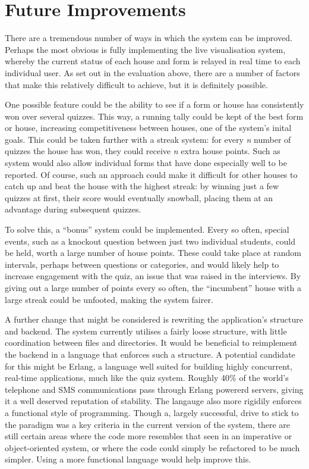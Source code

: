 \section{Future Improvements} %
\label{sec:future_improvements}
There are a tremendous number of ways in which the system can be improved. Perhaps the most obvious is fully implementing the live visualisation system, whereby the current status of each house and form is relayed in real time to each individual user. As set out in the evaluation above, there are a number of factors that make this relatively difficult to achieve, but it is definitely possible.

One possible feature could be the ability to see if a form or house has consistently won over several quizzes. This way, a running tally could be kept of the best form or house, increasing competitiveness between houses, one of the system's inital goals. This could be taken further with a streak system: for every \textit{n} number of quizzes the house has won, they could receive \textit{n} extra house points. Such as system would also allow individual forms that have done especially well to be reported. Of course, such an approach could make it difficult for other houses to catch up and beat the house with the highest streak: by winning just a few quizzes at first, their score would eventually snowball, placing them at an advantage during subsequent quizzes.

To solve this, a ``bonus'' system could be implemented. Every so often, special events, such as a knockout question between just two individual students, could be held, worth a large number of house points. These could take place at random intervals, perhaps between questions or categories, and would likely help to increase engagement with the quiz, an issue that was raised in the interviews. By giving out a large number of points every so often, the ``incumbent'' house with a large streak could be unfooted, making the system fairer.

A further change that might be considered is rewriting the application's structure and backend. The system currently utilises a fairly loose structure, with little coordination between files and directories. It would be beneficial to reimplement the backend in a language that enforces such a structure. A potential candidate for this might be Erlang, a language well suited for building highly concurrent, real-time applications, much like the quiz system. Roughly 40\% of the world's telephone and SMS communications pass through Erlang powererd servers, giving it a well deserved reputation of stability. The langauge also more rigidily enforces a functional style of programming. Though a, largely successful, drive to stick to the paradigm was a key criteria in the current version of the system, there are still certain areas where the code more resembles that seen in an imperative or object-oriented system, or where the code could simply be refactored to be much simpler. Using a more functional language would help improve this.
